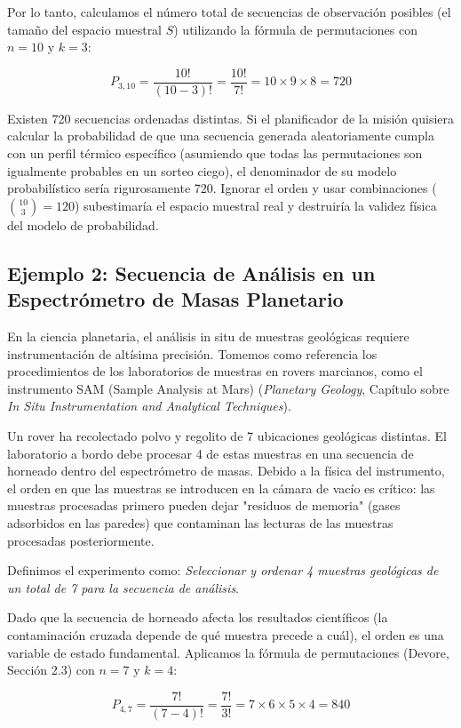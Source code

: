 Por lo tanto, calculamos el número total de secuencias de observación posibles (el tamaño del espacio muestral $S$) utilizando la fórmula de permutaciones con $n = 10$ y $k = 3$:

$$ P_{3,10} = \frac{10!}{(10-3)!} = \frac{10!}{7!} = 10 \times 9 \times 8 = 720 $$

Existen 720 secuencias ordenadas distintas. Si el planificador de la misión quisiera calcular la probabilidad de que una secuencia generada aleatoriamente cumpla con un perfil térmico específico (asumiendo que todas las permutaciones son igualmente probables en un sorteo ciego), el denominador de su modelo probabilístico sería rigurosamente 720. Ignorar el orden y usar combinaciones ($\binom{10}{3} = 120$) subestimaría el espacio muestral real y destruiría la validez física del modelo de probabilidad.

\subsection{Ejemplo 2: Secuencia de Análisis en un Espectrómetro de Masas Planetario}

En la ciencia planetaria, el análisis in situ de muestras geológicas requiere instrumentación de altísima precisión. Tomemos como referencia los procedimientos de los laboratorios de muestras en rovers marcianos, como el instrumento SAM (Sample Analysis at Mars) (\textit{Planetary Geology}, Capítulo sobre \textit{In Situ Instrumentation and Analytical Techniques}).

Un rover ha recolectado polvo y regolito de 7 ubicaciones geológicas distintas. El laboratorio a bordo debe procesar 4 de estas muestras en una secuencia de horneado dentro del espectrómetro de masas. Debido a la física del instrumento, el orden en que las muestras se introducen en la cámara de vacío es crítico: las muestras procesadas primero pueden dejar "residuos de memoria" (gases adsorbidos en las paredes) que contaminan las lecturas de las muestras procesadas posteriormente.

Definimos el experimento como: \textit{Seleccionar y ordenar 4 muestras geológicas de un total de 7 para la secuencia de análisis}.

Dado que la secuencia de horneado afecta los resultados científicos (la contaminación cruzada depende de qué muestra precede a cuál), el orden es una variable de estado fundamental. Aplicamos la fórmula de permutaciones (Devore, Sección 2.3) con $n = 7$ y $k = 4$:

$$ P_{4,7} = \frac{7!}{(7-4)!} = \frac{7!}{3!} = 7 \times 6 \times 5 \times 4 = 840 $$

